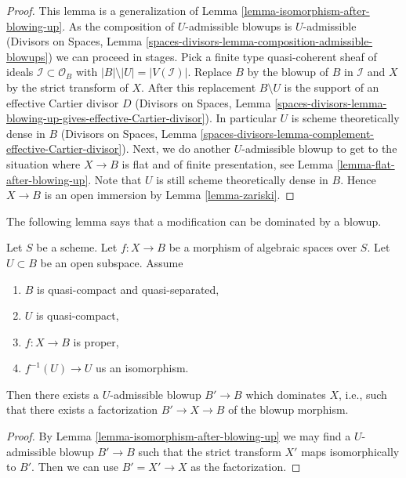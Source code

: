 \begin{proof}
This lemma is a generalization of
Lemma \ref{lemma-isomorphism-after-blowing-up}.
As the composition of $U$-admissible blowups is $U$-admissible
(Divisors on Spaces, Lemma
\ref{spaces-divisors-lemma-composition-admissible-blowups})
we can proceed in stages. Pick a finite type quasi-coherent sheaf
of ideals $\mathcal{I} \subset \mathcal{O}_B$ with
$|B| \setminus |U| = |V(\mathcal{I})|$. Replace $B$ by the blowup
of $B$ in $\mathcal{I}$ and $X$ by the strict transform of $X$.
After this replacement $B \setminus U$ is the support of an effective
Cartier divisor $D$ (Divisors on Spaces, Lemma
\ref{spaces-divisors-lemma-blowing-up-gives-effective-Cartier-divisor}).
In particular $U$ is scheme theoretically dense in $B$
(Divisors on Spaces, Lemma
\ref{spaces-divisors-lemma-complement-effective-Cartier-divisor}).
Next, we do another $U$-admissible blowup to get to the situation where
$X \to B$ is flat and of finite presentation, see
Lemma \ref{lemma-flat-after-blowing-up}. Note that $U$ is still scheme
theoretically dense in $B$. Hence $X \to B$ is an open immersion by
Lemma \ref{lemma-zariski}.
\end{proof}

\noindent
The following lemma says that a modification can be dominated
by a blowup.

\begin{lemma}
\label{lemma-dominate-modification-by-blowup}
Let $S$ be a scheme. Let $f : X \to B$ be a morphism of algebraic spaces
over $S$. Let $U \subset B$ be an open subspace. Assume
\begin{enumerate}
\item $B$ is quasi-compact and quasi-separated,
\item $U$ is quasi-compact,
\item $f : X \to B$ is proper,
\item $f^{-1}(U) \to U$ us an isomorphism.
\end{enumerate}
Then there exists a $U$-admissible blowup $B' \to B$ which dominates $X$,
i.e., such that there exists a factorization $B' \to X \to B$
of the blowup morphism.
\end{lemma}

\begin{proof}
By Lemma \ref{lemma-isomorphism-after-blowing-up} we may find a $U$-admissible
blowup $B' \to B$ such that the strict transform $X'$ maps isomorphically to
$B'$. Then we can use $B' = X' \to X$ as the factorization.
\end{proof}

